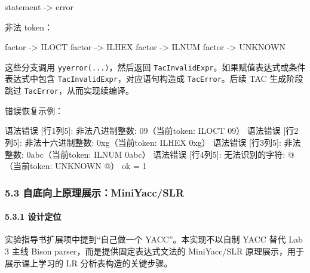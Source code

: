 \documentclass[
  a4paper,
  fontset=none,
]{ctexart}
\newenvironment{Shaded}{}{}
\newcommand{\NormalTok}[1]{#1}
\begin{document}
\begin{Shaded}
\begin{Highlighting}[]
\NormalTok{statement {-}\textgreater{} error}
\end{Highlighting}
\end{Shaded}

非法 token：

\begin{Shaded}
\begin{Highlighting}[]
\NormalTok{factor {-}\textgreater{} ILOCT}
\NormalTok{factor {-}\textgreater{} ILHEX}
\NormalTok{factor {-}\textgreater{} ILNUM}
\NormalTok{factor {-}\textgreater{} UNKNOWN}
\end{Highlighting}
\end{Shaded}

这些分支调用 \texttt{yyerror(...)}，然后返回
\texttt{TacInvalidExpr}。如果赋值表达式或条件表达式中包含
\texttt{TacInvalidExpr}，对应语句构造成 \texttt{TacError}。后续 TAC
生成阶段跳过 \texttt{TacError}，从而实现续编译。

错误恢复示例：

\begin{Shaded}
\begin{Highlighting}[]
\NormalTok{语法错误 [行1列5]: 非法八进制整数: 09（当前token: ILOCT \textquotesingle{}09\textquotesingle{}）}
\NormalTok{语法错误 [行2列5]: 非法十六进制整数: 0xg（当前token: ILHEX \textquotesingle{}0xg\textquotesingle{}）}
\NormalTok{语法错误 [行3列5]: 非法整数: 0abc（当前token: ILNUM \textquotesingle{}0abc\textquotesingle{}）}
\NormalTok{语法错误 [行4列5]: 无法识别的字符: \textquotesingle{}@\textquotesingle{}（当前token: UNKNOWN \textquotesingle{}@\textquotesingle{}）}
\NormalTok{ok = 1}
\end{Highlighting}
\end{Shaded}

\hypertarget{ux81eaux5e95ux5411ux4e0aux539fux7406ux5c55ux793aminiyaccslr}{%
\subsubsection{5.3
自底向上原理展示：MiniYacc/SLR}\label{ux81eaux5e95ux5411ux4e0aux539fux7406ux5c55ux793aminiyaccslr}}

\hypertarget{ux8bbeux8ba1ux5b9aux4f4d}{%
\paragraph{5.3.1 设计定位}\label{ux8bbeux8ba1ux5b9aux4f4d}}

实验指导书扩展项中提到``自己做一个 YACC''。本实现不以自制 YACC 替代 Lab
3 主线 Bison parser，而是提供固定表达式文法的 MiniYacc/SLR
原理展示，用于展示课上学习的 LR 分析表构造的关键步骤。
\end{document}
